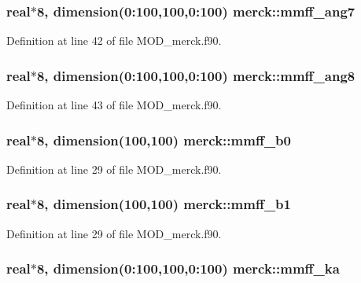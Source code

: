 \hypertarget{classmerck_adbca68738b40baa8b5c799253076db2f}{
\subsubsection[{mmff\-\_\-ang7}]{\setlength{\rightskip}{0pt plus 5cm}real$\ast$8, dimension(0\-:100,100,0\-:100) merck\-::mmff\-\_\-ang7}}\label{classmerck_adbca68738b40baa8b5c799253076db2f}


Definition at line 42 of file M\-O\-D\-\_\-merck.\-f90.

\hypertarget{classmerck_a8669ff02d8bb48b952f4022ebfb40465}{
\subsubsection[{mmff\-\_\-ang8}]{\setlength{\rightskip}{0pt plus 5cm}real$\ast$8, dimension(0\-:100,100,0\-:100) merck\-::mmff\-\_\-ang8}}\label{classmerck_a8669ff02d8bb48b952f4022ebfb40465}


Definition at line 43 of file M\-O\-D\-\_\-merck.\-f90.

\hypertarget{classmerck_ae69e878a1f3cb3cbb3d6daae813627dd}{
\subsubsection[{mmff\-\_\-b0}]{\setlength{\rightskip}{0pt plus 5cm}real$\ast$8, dimension(100,100) merck\-::mmff\-\_\-b0}}\label{classmerck_ae69e878a1f3cb3cbb3d6daae813627dd}


Definition at line 29 of file M\-O\-D\-\_\-merck.\-f90.

\hypertarget{classmerck_aa90ea277f5b16112bf0affb6a613206e}{
\subsubsection[{mmff\-\_\-b1}]{\setlength{\rightskip}{0pt plus 5cm}real$\ast$8, dimension(100,100) merck\-::mmff\-\_\-b1}}\label{classmerck_aa90ea277f5b16112bf0affb6a613206e}


Definition at line 29 of file M\-O\-D\-\_\-merck.\-f90.

\hypertarget{classmerck_a8fa0ce7da7f6b22c4f17f7d3c34740fd}{
\subsubsection[{mmff\-\_\-ka}]{\setlength{\rightskip}{0pt plus 5cm}real$\ast$8, dimension(0\-:100,100,0\-:100) merck\-::mmff\-\_\-ka}}\label{classmerck_a8fa0ce7da7f6b22c4f17f7d3c34740fd}



